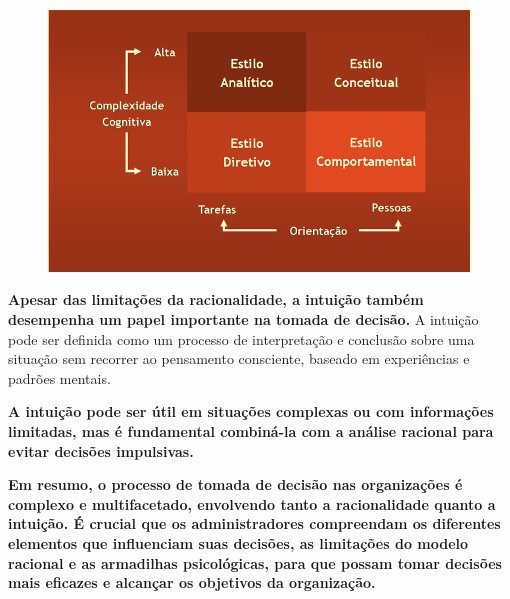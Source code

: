 \begin{figure}[H]
    \centering
    \begin{minipage}{0.6\textwidth}
        \centering
        \includegraphics[width=\textwidth]{img/imagem7.png}
        \label{fig:exemplo3}
    \end{minipage}
\end{figure}

\textbf{Apesar das limitações da racionalidade, a intuição também desempenha um papel importante na tomada de decisão.} A intuição pode ser definida como um processo de interpretação e conclusão sobre uma situação sem recorrer ao pensamento consciente, baseado em experiências e padrões mentais.

\textbf{A intuição pode ser útil em situações complexas ou com informações limitadas, mas é fundamental combiná-la com a análise racional para evitar decisões impulsivas.}

\textbf{Em resumo, o processo de tomada de decisão nas organizações é complexo e multifacetado, envolvendo tanto a racionalidade quanto a intuição. É crucial que os administradores compreendam os diferentes elementos que influenciam suas decisões, as limitações do modelo racional e as armadilhas psicológicas, para que possam tomar decisões mais eficazes e alcançar os objetivos da organização.}
